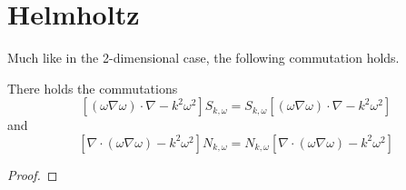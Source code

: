 \documentclass[]{article}
\begin{document}
\section{Helmholtz}

Much like in the 2-dimensional case, the following commutation holds.
\begin{The}
	There holds the commutations
	\[\left[(\omega \nabla \omega)\cdot \nabla - k^2 \omega^2\right]  S_{k,\omega} =S_{k,\omega} \left[(\omega \nabla \omega)\cdot \nabla - k^2 \omega^2\right]\]
	and 
	\[\left[\nabla \cdot (\omega \nabla \omega)  - k^2 \omega^2\right] N_{k,\omega} = N_{k,\omega} \left[\nabla \cdot (\omega \nabla \omega)  - k^2 \omega^2\right] \]
\end{The}
\begin{proof}
	
\end{proof}




\end{document}
